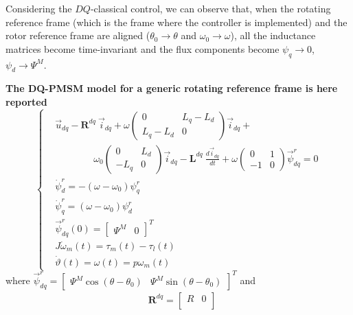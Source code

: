 \documentclass[12pt,a4paper,oneside]{book}
\begin{document}
\begin{onehalfspace}
Considering the $DQ$-classical control, we can observe that, when the 
rotating reference frame (which is the frame where the controller is 
implemented) and the rotor reference frame are aligned ($\theta_0 
\rightarrow \theta$ and $\omega_0 \rightarrow \omega$), all the inductance 
matrices become time-invariant and the flux components become $\psi_{q} 
\rightarrow 0$, $\psi_{d} \rightarrow \Psi^M$. 

\begin{mybox}
	\textbf{The DQ-PMSM model for a generic rotating reference frame is 
		here reported}
	\begin{equation}\label{twophase_eq1bis}
		\left\lbrace \begin{aligned}
			& \vec{u}_{dq}-\mathbf{R}^{dq}\ \vec{i}_{dq} + 
			\omega\begin{pmatrix} 0 & L_q-L_d\\ L_q-L_d & 0 
			\end{pmatrix}\vec{i}_{dq} + \\[6pt]
			& \qquad\qquad \omega_0\begin{pmatrix} 0 & L_d\\ 
				-L_q & 0 \end{pmatrix}\vec{i}_{dq} - \mathbf{L}^{dq}\ 
			\frac{d\vec{i}_{dq}}{dt} + \omega\begin{pmatrix} 0 & 1\\-1 & 0 
			\end{pmatrix}\vec{\psi}_{dq}^r = 0 \\[6pt]
			&\dot{\psi}_d^r = -\left( \omega-\omega_0\right)\psi_q^r \\[6pt]
			&\dot{\psi}_q^r = \left( \omega-\omega_0\right)\psi_d^r \\[6pt]
			& \vec{\psi}^r_{dq}(0) = \begin{bmatrix} \Psi^M &  0 
			\end{bmatrix}^T \\[6pt]
			& J\dot{\omega}_m(t) = \tau_m(t)-\tau_l(t) \\[6pt]
			& \dot{\vartheta}(t) = \omega(t) = p\omega_m(t)
		\end{aligned} \right. 
	\end{equation}
	where $\vec{\psi}^r_{dq} = \begin{bmatrix} \Psi^M\cos(\theta-\theta_0) 
		&  \Psi^M\sin(\theta-\theta_0)\end{bmatrix}^T$ and
	\begin{equation*}
		\begin{aligned}
			& \mathbf{R}^{dq} = 
			\begin{bmatrix} R &  0 \\

\end{bmatrix}
\end{aligned}
\end{equation*}
\end{mybox}
\end{onehalfspace}
\end{document}
